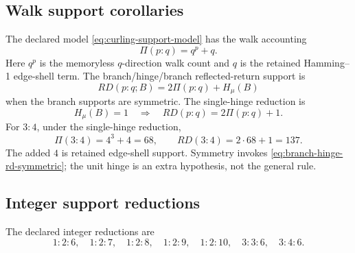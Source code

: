 \subsection{Walk support corollaries}\label{app:rd-tests:corollaries}
The declared model \eqref{eq:curling-support-model} has the walk accounting
\begin{equation}
\Pi(p{:}q)=q^p+q.
\label{app:rd:eq:path-support}
\end{equation}
Here \(q^p\) is the memoryless \(q\)-direction walk count and \(q\) is the retained Hamming--1 edge-shell term. The branch/hinge/branch reflected-return support is
\begin{equation}
RD(p{:}q;B)=2\Pi(p{:}q)+H_\mu(B)
\label{app:rd:eq:reflected-return}
\end{equation}
when the branch supports are symmetric. The single-hinge reduction is
\begin{equation}
H_\mu(B)=1
\quad\Longrightarrow\quad
RD(p{:}q)=2\Pi(p{:}q)+1.
\label{app:rd:eq:single-hinge-return}
\end{equation}
For \(3{:}4\), under the single-hinge reduction,
\begin{equation}
\Pi(3{:}4)=4^3+4=68,
\qquad
RD(3{:}4)=2\cdot68+1=137.
\label{app:rd:eq:three-four-rd}
\end{equation}
The added \(4\) is retained edge-shell support. Symmetry invokes
\eqref{eq:branch-hinge-rd-symmetric}; the unit hinge is an extra hypothesis,
not the general rule.

\subsection{Integer support reductions}\label{app:rd-tests:support-reductions}
The declared integer reductions are
\[
1{:}2{:}6,
\quad
1{:}2{:}7,
\quad
1{:}2{:}8,
\quad
1{:}2{:}9,
\quad
1{:}2{:}10,
\quad
3{:}3{:}6,
\quad
3{:}4{:}6.
\]




